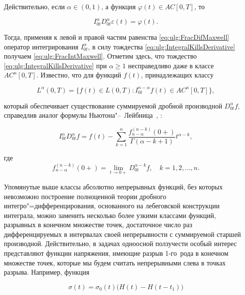 Действительно, если $\alpha\in(0, 1)$, а функция $\varphi(t)\in AC[0, T]$, то

\begin{equation}

\label{eq:ulg:IntegralKillsDerivative}

I^{\alpha}_{0t}D^{\alpha}_{0t}\varepsilon(t)=\varphi(t).

\end{equation}

Тогда, применяя к левой и правой частям равенства \eqref{eq:ulg:FracDifMaxwell} оператор интегрирования $I^{\alpha}_{0t}$, в силу тождества \eqref{eq:ulg:IntegralKillsDerivative} получаем \eqref{eq:ulg:FracIntMaxwell}. Отметим здесь, что тождество \eqref{eq:ulg:IntegralKillsDerivative} при $\alpha\geq 1$ несправедливо даже в классе $AC^{n}[0,T]$.  Известно, что для функций $f(t)$, принадлежащих классу 

$$L^{\alpha}(0,T)=\lbrace f(t)\in L(0, T): I^{n-\alpha}_{0t}f(t)\in AC^{n}[0,T]\rbrace,$$ 

который обеспечивает существование суммируемой дробной производной $D^{\alpha}_{0t}f$, справедлив аналог формулы Ньютона"--~Лейбница~\cite[с.~75]{ulg:bib:K-S-T}, \cite[с.~50]{ulg:bib:S-K-M}:

\begin{equation}\label{eq:ulg:NewtonLeibnizAnalog}

I^{\alpha}_{0t}D^{\alpha}_{0t}f=f(t)-\sum^{n}_{k=1}\frac{f^{(n-k)}_{n-\alpha}(0+)}{\Gamma(\alpha-k+1)}t^{\alpha-k},

\end{equation}

где $$f^{(n-k)}_{n-\alpha}(0+)=\lim_{t\to 0+}D^{\alpha-k}_{0t}f,\quad k=1, 2, \dots, n.$$



Упомянутые выше классы абсолютно непрерывных функций, без которых невозможно построение полноценной теории дробного интегро"=дифференцирования, основанного на лебеговской конструкции интеграла, можно заменить несколько более узкими классами функций, разрывных в конечном множестве точек, достаточное число раз дифференцируемых в интервалах своей непрерывности с суммируемой старшей производной. Действительно, в задачах одноосной ползучести особый интерес представляют функции напряжения, имеющие разрыв 1-го~рода в конечном множестве точек, которые мы будем считать непрерывными слева в точках разрыва. Например, функция

\begin{equation}\label{eq:ulg:StressT}

\sigma(t)=\sigma_{0}(t)\bigl(H(t)-H(t-t_{1})\bigr)

\end{equation}

